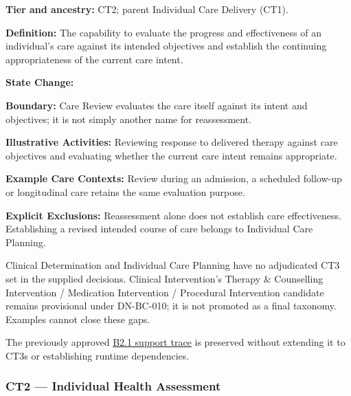 \textbf{Tier and ancestry:} CT2; parent Individual Care Delivery (CT1).

\label{rad:business:293}

\textbf{Definition:} The capability to evaluate the progress and effectiveness of an individual's care against its intended objectives and establish the continuing appropriateness of the current care intent.

\label{rad:business:297}

\textbf{State Change:} \texttt{}

\label{rad:business:299}

\textbf{Boundary:} Care Review evaluates the care itself against its intent and objectives; it is not simply another name for reassessment.

\label{rad:business:302}

\textbf{Illustrative Activities:} Reviewing response to delivered therapy against care objectives and evaluating whether the current care intent remains appropriate.

\label{rad:business:305}

\textbf{Example Care Contexts:} Review during an admission, a scheduled follow-up or longitudinal care retains the same evaluation purpose.

\label{rad:business:308}

\textbf{Explicit Exclusions:} Reassessment alone does not establish care effectiveness. Establishing a revised intended course of care belongs to Individual Care Planning.

\label{rad:business:312}

Clinical Determination and Individual Care Planning have no adjudicated CT3 set in the supplied decisions. Clinical Intervention’s Therapy \& Counselling Intervention /\allowbreak{} Medication Intervention /\allowbreak{} Procedural Intervention candidate remains provisional under DN-BC-010; it is not promoted as a final taxonomy. Examples cannot close these gaps.

\label{rad:business:314}

The previously approved \hyperref[rad:b2-1]{B2.1 support trace} is preserved without extending it to CT3s or establishing runtime dependencies.

\label{rad:business:316}
\subsubsection*{CT2 — Individual Health Assessment}
\label{rad:business:318}

